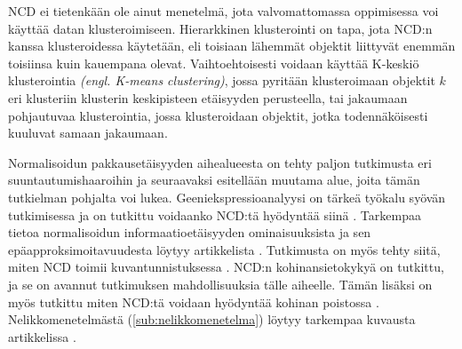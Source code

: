 \documentclass[12pt,finnish]{tktltiki2}
\theoremstyle{definition}
\theoremstyle{remark}
\newcommand{\engl}[1]{\emph{(engl. #1)}}
\begin{document}
  NCD ei tietenkään ole ainut menetelmä, jota valvomattomassa oppimisessa voi käyttää datan klusteroimiseen.
  Hierarkkinen klusterointi on tapa, jota NCD:n kanssa klusteroidessa käytetään, eli toisiaan lähemmät objektit liittyvät enemmän toisiinsa kuin kauempana olevat.
  Vaihtoehtoisesti voidaan käyttää K-keskiö klusterointia \engl{K-means clustering}, jossa pyritään klusteroimaan objektit $k$ eri klusteriin klusterin keskipisteen etäisyyden perusteella, tai jakaumaan pohjautuvaa klusterointia, jossa klusteroidaan objektit, jotka todennäköisesti kuuluvat samaan jakaumaan.

  Normalisoidun pakkausetäisyyden aihealueesta on tehty paljon tutkimusta eri suuntautumishaaroihin ja seuraavaksi esitellään muutama alue, joita tämän tutkielman pohjalta voi lukea.
  Geeniekspressioanalyysi on tärkeä työkalu syövän tutkimisessa ja on tutkittu voidaanko NCD:tä hyödyntää siinä \cite{nykter2005normalized}.
  Tarkempaa tietoa normalisoidun informaatioetäisyyden ominaisuuksista ja sen epäapproksimoitavuudesta löytyy artikkelista \cite{terwijn2011nonapproximability}.
  Tutkimusta on myös tehty siitä, miten NCD toimii kuvantunnistuksessa \cite{doi:10.1117/12.704334}.
  NCD:n kohinansietokykyä on tutkittu, ja se on avannut tutkimuksen mahdollisuuksia tälle aiheelle. Tämän lisäksi on myös tutkittu miten NCD:tä voidaan hyödyntää kohinan poistossa \cite{vitanyi2013similarity}.
  Nelikkomenetelmästä (\ref{sub:nelikkomenetelma}) löytyy tarkempaa kuvausta artikkelissa \cite{cilibrasi2011fast}.


%
%

%

% 





%
\end{document}
